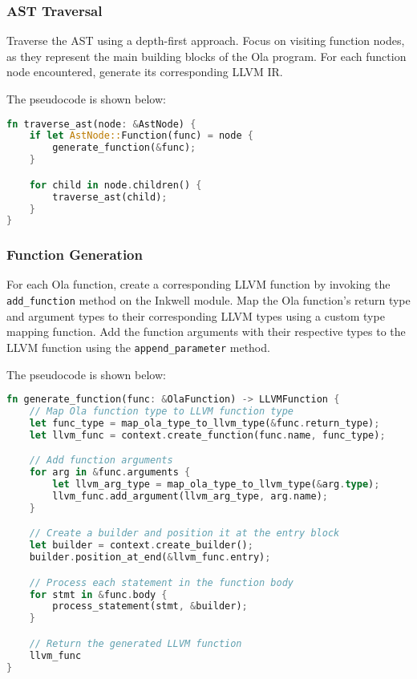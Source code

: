 \subsubsection*{AST Traversal}

Traverse the AST using a depth-first approach. Focus on visiting function nodes, as they represent the main building blocks of the Ola program. For each function node encountered, generate its corresponding LLVM IR.

The pseudocode is shown below:

\begin{lstlisting}[language=Rust]
fn traverse_ast(node: &AstNode) {
    if let AstNode::Function(func) = node {
        generate_function(&func);
    }

    for child in node.children() {
        traverse_ast(child);
    }
}
\end{lstlisting}

\subsubsection*{Function Generation}

For each Ola function, create a corresponding LLVM function by invoking the \texttt{add\_function} method on the Inkwell module. Map the Ola function's return type and argument types to their corresponding LLVM types using a custom type mapping function. Add the function arguments with their respective types to the LLVM function using the \texttt{append\_parameter} method.

The pseudocode is shown below:

\begin{lstlisting}[language=Rust]
fn generate_function(func: &OlaFunction) -> LLVMFunction {
    // Map Ola function type to LLVM function type
    let func_type = map_ola_type_to_llvm_type(&func.return_type);
    let llvm_func = context.create_function(func.name, func_type);

    // Add function arguments
    for arg in &func.arguments {
        let llvm_arg_type = map_ola_type_to_llvm_type(&arg.type);
        llvm_func.add_argument(llvm_arg_type, arg.name);
    }

    // Create a builder and position it at the entry block
    let builder = context.create_builder();
    builder.position_at_end(&llvm_func.entry);

    // Process each statement in the function body
    for stmt in &func.body {
        process_statement(stmt, &builder);
    }

    // Return the generated LLVM function
    llvm_func
}
\end{lstlisting}

